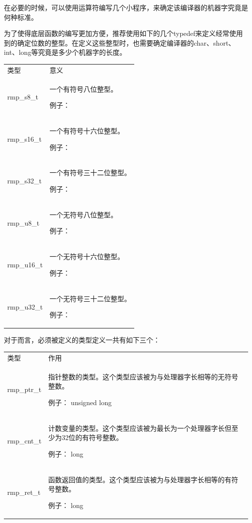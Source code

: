 在必要的时候，可以使用运算符编写几个小程序，来确定该编译器的机器字究竟是何种标准。

为了使得底层函数的编写更加方便，推荐使用如下的几个typedef来定义经常使用到的确定位数的整型。在定义这些整型时，也需要确定编译器的char、short、int、long等究竟是多少个机器字的长度。

\label{tab:overview-of-typedefs}

{\def\LTcaptype{none} %
\begin{longtable}[]{@{}
  >{\raggedright\arraybackslash}p{}
  >{\raggedright\arraybackslash}p{}@{}}
\toprule\noalign{}
\endhead
\bottomrule\noalign{}
\endlastfoot
类型 & 意义 \\
rmp\_s8\_t & 一个有符号八位整型。

例子： \\
rmp\_s16\_t & 一个有符号十六位整型。

例子： \\
rmp\_s32\_t & 一个有符号三十二位整型。

例子： \\
rmp\_u8\_t & 一个无符号八位整型。

例子： \\
rmp\_u16\_t & 一个无符号十六位整型。

例子： \\
rmp\_u32\_t & 一个无符号三十二位整型。

例子： \\
\end{longtable}
}

对于而言，必须被定义的类型定义一共有如下三个：

\label{tab:overview-of-necessary-typedefs}

{\def\LTcaptype{none} %
\begin{longtable}[]{@{}
  >{\raggedright\arraybackslash}p{}
  >{\raggedright\arraybackslash}p{}@{}}
\toprule\noalign{}
\endhead
\bottomrule\noalign{}
\endlastfoot
类型 & 作用 \\
rmp\_ptr\_t &
指针整数的类型。这个类型应该被为与处理器字长相等的无符号整数。

例子： unsigned long \\
rmp\_cnt\_t &
计数变量的类型。这个类型应该被为最长为一个处理器字长但至少为32位的有符号整数。

例子： long \\
rmp\_ret\_t &
函数返回值的类型。这个类型应该被为与处理器字长相等的有符号整数。

例子： long \\
\end{longtable}
}

